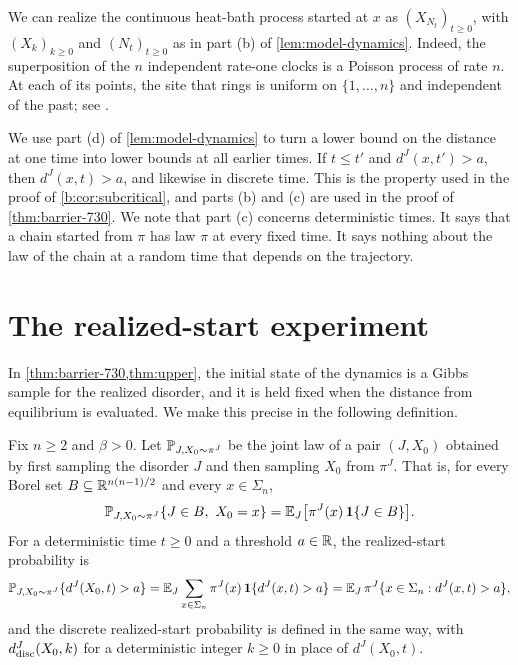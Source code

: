 We can realize the continuous heat-bath process started at $x$ as $(X_{N_t})_{t\ge0}$, with $(X_k)_{k\ge0}$ and $(N_t)_{t\ge0}$ as in part (b) of \cref{lem:model-dynamics}. Indeed, the superposition of the $n$ independent rate-one clocks is a Poisson process of rate $n$. At each of its points, the site that rings is uniform on $\{1,\dots,n\}$ and independent of the past; see \cite[Section~20.1, (20.1)--(20.6)]{levin-peres-2017}.

We use part (d) of \cref{lem:model-dynamics} to turn a lower bound on the distance at one time into lower bounds at all earlier times. If $t\le t'$ and $d^J(x,t')>a$, then $d^J(x,t)>a$, and likewise in discrete time. This is the property used in the proof of \cref{b:cor:subcritical}, and parts (b) and (c) are used in the proof of \cref{thm:barrier-730}. We note that part (c) concerns deterministic times. It says that a chain started from $\pi$ has law $\pi$ at every fixed time. It says nothing about the law of the chain at a random time that depends on the trajectory.

\section{The realized-start experiment}\label{sec:model-joint}

In \cref{thm:barrier-730,thm:upper}, the initial state of the dynamics is a Gibbs sample for the realized disorder, and it is held fixed when the distance from equilibrium is evaluated. We make this precise in the following definition.

\begin{definition}\label{def:model-joint}
Fix $n\ge2$ and $\beta>0$. Let $\mathbb P_{J,X_0\sim\pi^J}$ be the joint law of a pair $(J,X_0)$ obtained by first sampling the disorder $J$ and then sampling $X_0$ from $\pi^J$. That is, for every Borel set $B\subseteq\mathbb R^{n(n-1)/2}$ and every $x\in\Sigma_n$,
\[
 \PP_{J,X_0\sim\pi^J}\{J\in B,\ X_0=x\}=\E_J\bigl[\pi^J(x)\,\mathbf 1\{J\in B\}\bigr].
\]
For a deterministic time $t\ge0$ and a threshold $a\in\mathbb R$, the realized-start probability is
\begin{equation}\label{eq:common-joint}
 \mathbb P_{J,X_0\sim\pi^J}\{d^J(X_0,t)>a\}
 =\mathbb E_J\sum_{x\in\Sigma_n}\pi^J(x)\,\mathbf 1\{d^J(x,t)>a\}
 =\mathbb E_J\,\pi^J\{x\in\Sigma_n:d^J(x,t)>a\},
\end{equation}
and the discrete realized-start probability is defined in the same way, with $d^J_{\rm disc}(X_0,k)$ for a deterministic integer $k\ge0$ in place of $d^J(X_0,t)$.
\end{definition}

